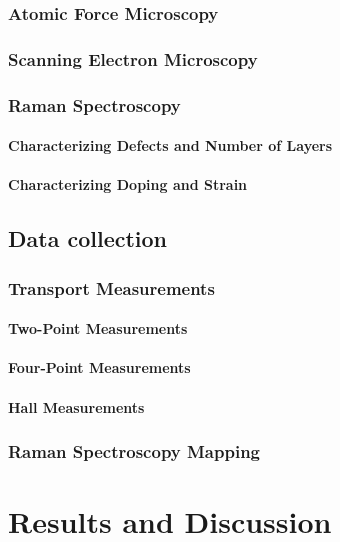 \documentclass[edeposit,fullpage,draftthesis]{uiucthesis2009}
\begin{document}
        \subsection{Atomic Force Microscopy}
        \subsection{Scanning Electron Microscopy}
        \subsection{Raman Spectroscopy}
            \subsubsection{Characterizing Defects and Number of Layers}
            \subsubsection{Characterizing Doping and Strain}
    
    \section{Data collection}
        \subsection{Transport Measurements}
            \subsubsection*{Two-Point Measurements}
            \subsubsection*{Four-Point Measurements}
            \subsubsection*{Hall Measurements}
        \subsection{Raman Spectroscopy Mapping}
    
    
\chapter{Results and Discussion}
\end{document}

